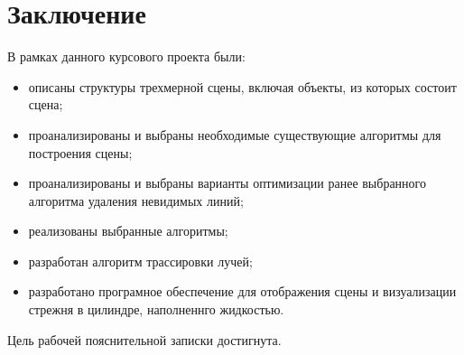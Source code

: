 \chapter*{Заключение}

В рамках данного курсового проекта были:

\begin{itemize}
	\item описаны структуры трехмерной сцены, включая объекты, из которых состоит сцена;
	\item проанализированы и выбраны необходимые существующие алгоритмы для построения сцены;
	\item проанализированы и выбраны варианты оптимизации ранее выбранного алгоритма удаления невидимых линий;
	\item реализованы выбранные алгоритмы;
	\item разработан алгоритм трассировки лучей;
	\item разработано програмное обеспечение для отображения сцены и визуализации стрежня в цилиндре, наполненнго жидкостью.
\end{itemize}

Цель рабочей пояснительной записки достигнута.
